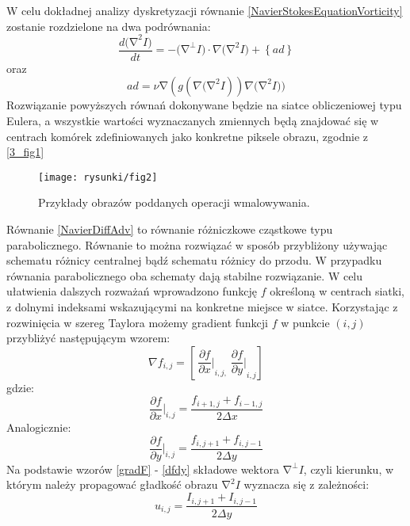 \documentclass[12pt, twoside, openany]{report}
\theoremstyle{definition}
\begin{document}
W celu dokładnej analizy dyskretyzacji równanie \eqref{NavierStokesEquationVorticity} zostanie rozdzielone na dwa podrównania:
\begin{equation}
\frac{d{\mathrm{(}\mathrm{\nabla }}^2I)}{dt}=-{\mathrm{(}\mathrm{\nabla }}^{\bot }I)\cdot \nabla {\mathrm{(}\mathrm{\nabla }}^2I)+\left\{ad\right\}
\label{NavierDiffAdv}
\end{equation}
oraz
\begin{equation}
{ad}=\nu \mathrm{\nabla }(g(\nabla {\mathrm{(}\mathrm{\nabla }}^2I))\nabla {\mathrm{(}\mathrm{\nabla }}^2I))
\label{NavierAdv}
\end{equation}
Rozwiązanie powyższych równań dokonywane będzie na siatce obliczeniowej typu Eulera, a wszystkie wartości wyznaczanych zmiennych będą znajdować się w centrach komórek zdefiniowanych jako konkretne piksele obrazu, zgodnie z \autoref{3_fig1} 
\begin{figure}[!h]
	\centering
	\texttt{[image: rysunki/fig2]}
	\caption{Przykłady obrazów poddanych operacji wmalowywania.}
	\label{3_fig2}
\end{figure}
Równanie \eqref{NavierDiffAdv} to równanie różniczkowe cząstkowe typu parabolicznego. Równanie to  można rozwiązać w sposób przybliżony używając schematu różnicy centralnej bądź schematu różnicy do przodu. W przypadku równania parabolicznego oba schematy dają stabilne rozwiązanie. W celu ułatwienia dalszych rozważań wprowadzono funkcję $f$ określoną w centrach siatki, z dolnymi indeksami wskazującymi na konkretne miejsce w siatce. Korzystając z rozwinięcia w szereg Taylora możemy gradient funkcji $f$ w punkcie $(i,j)$ przybliżyć następującym wzorem:
\begin{equation}
\nabla f_{i,j}=\left[\ {\frac{\partial f}{\partial x}\bigg |}_{i,j,} \ {\frac{\partial f}{\partial y}\bigg |}_{i,j}\right]
\label{gradF}
\end{equation}
gdzie:
\begin{equation}
{\frac{\partial f}{\partial x}} {\bigg |}_{i,j}=\frac{f_{i+1,j}+f_{i-1,j}}{2\Delta x}
\label{dfdx}
\end{equation}
Analogicznie:
\begin{equation}
{\frac{\partial f}{\partial y}} {\bigg |}_{i,j}=\frac{f_{i,j+1}+f_{i,j-1}}{2\Delta y}
\label{dfdy}
\end{equation}
Na podstawie wzorów \eqref{gradF} - \eqref{dfdy} składowe wektora ${\mathrm{\nabla }}^{\bot }I$, czyli kierunku, w którym należy propagować gładkość obrazu ${\mathrm{\nabla }}^2I$ wyznacza się z zależności:
\begin{equation}
u_{i,j}=\frac{I_{i,j+1}+I_{i,j-1}}{2\Delta y} 
\label{u}
\end{equation}
\end{document}
